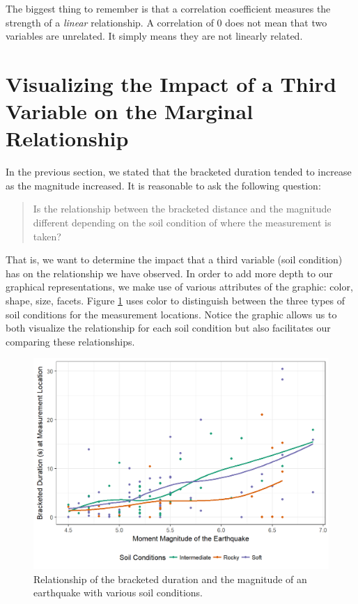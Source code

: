 \documentclass[]{book}
\theoremstyle{definition}
\theoremstyle{definition}
\theoremstyle{definition}
\theoremstyle{remark}
\begin{document}
The biggest thing to remember is that a correlation coefficient measures
the strength of a \emph{linear} relationship. A correlation of 0 does
not mean that two variables are unrelated. It simply means they are not
linearly related.

\section{Visualizing the Impact of a Third Variable on the Marginal
Relationship}\label{visualizing-the-impact-of-a-third-variable-on-the-marginal-relationship}

In the previous section, we stated that the bracketed duration tended to
increase as the magnitude increased. It is reasonable to ask the
following question:

\begin{quote}
Is the relationship between the bracketed distance and the magnitude
different depending on the soil condition of where the measurement is
taken?
\end{quote}

That is, we want to determine the impact that a third variable (soil
condition) has on the relationship we have observed. In order to add
more depth to our graphical representations, we make use of various
attributes of the graphic: color, shape, size, facets. Figure
\ref{fig:regsummaries-color} uses color to distinguish between the three
types of soil conditions for the measurement locations. Notice the
graphic allows us to both visualize the relationship for each soil
condition but also facilitates our comparing these relationships.

\begin{figure}

{\centering \includegraphics[width=0.8\linewidth]{./Images/regsummaries-color-1} 

}

\caption{Relationship of the bracketed duration and the magnitude of an earthquake with various soil conditions.}\label{fig:regsummaries-color}
\end{figure}
\end{document}
